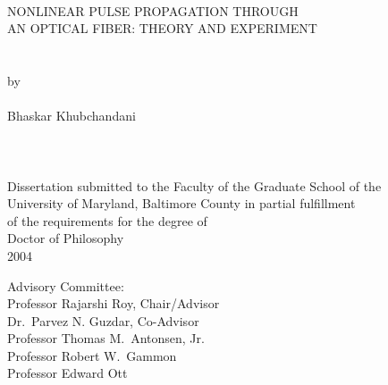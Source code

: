 
\thispagestyle{empty} \hbox{\ }
\vspace{.5in}

\renewcommand{\baselinestretch}{1}
\small\normalsize
\begin{center}

\large{{NONLINEAR PULSE PROPAGATION THROUGH \\
AN OPTICAL FIBER: THEORY AND EXPERIMENT}}\\
\ \\
\ \\
\large{by} \\
\ \\
\large{Bhaskar Khubchandani}%
\ \\
\ \\
\ \\
\ \\
\normalsize
Dissertation submitted to the Faculty of the Graduate School of the \\
University of Maryland, Baltimore County in partial fulfillment \\
of the requirements for the degree of \\
Doctor of Philosophy \\
2004
\end{center}

\vspace{7.5em}

\noindent Advisory Committee: \\
\hspace*{.5in}Professor Rajarshi Roy, Chair/Advisor \\
\hspace*{.5in}Dr.\ Parvez N. Guzdar, Co-Advisor \\
\hspace*{.5in}Professor Thomas M.\ Antonsen, Jr. \\
\hspace*{.5in}Professor Robert W.\ Gammon \\
\hspace*{.5in}Professor Edward Ott
